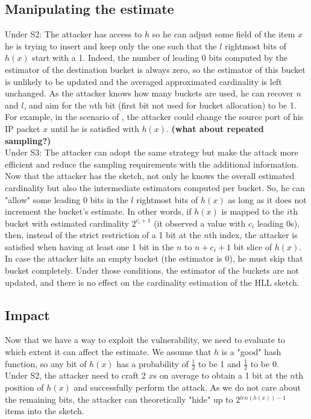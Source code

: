 \documentclass{IEEEtran}
\begin{document}
\subsection{Manipulating the estimate}
Under S2: The attacker has access to $h$ so he can adjust some field of the item $x$ he is trying to insert and keep only the one such that the $l$ rightmost bits of $h(x)$ start with a 1. Indeed, the number of leading 0 bits computed by the estimator of the destination bucket is always zero, so the estimator of this bucket is unlikely to be updated and the averaged approximated cardinality is left unchanged. As the attacker knows how many buckets are used, he can recover $n$ and $l$, and aim for the $n$th bit (first bit not used for bucket allocation) to be 1. For example, in the scenario of \cite{portscanhll}, the attacker could change the source port of his IP packet $x$ until he is satisfied with $h(x)$. \textbf{(what about repeated sampling?)}\\

Under S3: The attacker can adopt the same strategy but make the attack more efficient and reduce the sampling requirements with the additional information. Now that the attacker has the sketch, not only he knows the overall estimated cardinality but also the intermediate estimators computed per bucket. So, he can "allow" some leading 0 bits in the $l$ rightmost bits of $h(x)$ as long as it does not increment the bucket's estimate. In other words, if $h(x)$ is mapped to the $i$th bucket with estimated cardinality $2^{c_i + 1}$ (it observed a value with $c_i$ leading 0s), then, instead of the strict restriction of a 1 bit at the $n$th index, the attacker is satisfied when having at least one 1 bit in the $n$ to $n+c_i + 1$ bit slice of $h(x)$. In case the attacker hits an empty bucket (the estimator is 0), he must skip that bucket completely. Under those conditions, the estimator of the buckets are not updated, and there is no effect on the cardinality estimation of the HLL sketch.

\subsection{Impact}
Now that we have a way to exploit the vulnerability, we need to evaluate to which extent it can affect the estimate. We assume that $h$ is a "good" hash function, so any bit of $h(x)$ has a probability of $\frac{1}{2}$ to be 1 and $\frac{1}{2}$ to be 0.\\

Under S2, the attacker need to craft 2 $x$s on average to obtain a 1 bit at the $n$th position of $h(x)$ and successfully perform the attack. As we do not care about the remaining bits, the attacker can theoretically "hide" up to 2$^{len(h(x))-1}$ items into the sketch.\\
\end{document}
